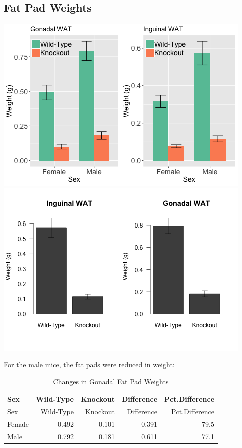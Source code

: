 \documentclass[]{article}
\begin{document}
\subsection{Fat Pad Weights}\label{fat-pad-weights}

\includegraphics{figures/wat-weights-1.png}
\includegraphics{figures/wat-weights-2.png}

For the male mice, the fat pads were reduced in weight:

\begin{longtable}[]{@{}lrrrr@{}}
\caption{Changes in Gonadal Fat Pad Weights}\tabularnewline
\toprule
Sex & Wild-Type & Knockout & Difference & Pct.Difference\tabularnewline
\midrule
\endfirsthead
\toprule
Sex & Wild-Type & Knockout & Difference & Pct.Difference\tabularnewline
\midrule
\endhead
Female & 0.492 & 0.101 & 0.391 & 79.5\tabularnewline
Male & 0.792 & 0.181 & 0.611 & 77.1\tabularnewline
\bottomrule
\end{longtable}
\end{document}
